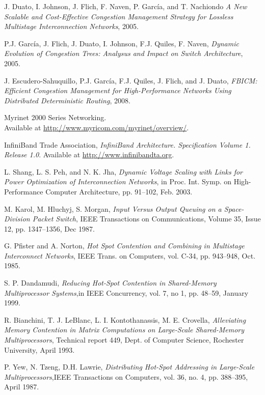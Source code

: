 \documentclass[12pt]{article}
\begin{document}
\begin{thebibliography}{99}

 J. Duato, I. Johnson, J. Flich, F. Naven, P. Garc\'ia, and T. Nachiondo \emph{A New Scalable and Cost-Effective Congestion Management Strategy for Lossless Multistage Interconnection Networks}, 2005.

 P.J. Garc\'ia, J. Flich, J. Duato, I. Johnson, F.J. Quiles, F. Naven, \emph{Dynamic Evolution of Congestion Trees: Analysus and Impact on Switch Architecture}, 2005.

 J. Escudero-Sahuquillo, P.J. Garc\'ia, F.J.  Quiles, J. Flich, and J. Duato, \emph{FBICM: Efficient Congestion Management for High-Performance Networks Using Distributed Deterministic Routing}, 2008.

 Myrinet 2000 Series	 Networking.\\
Available at 
\url{http://www.myricom.com/myrinet/overview/}.

 InfiniBand Trade Association, \emph{InfiniBand Architecture. Specification Volume 1. Release 1.0}. Available at \url{http://www.infinibandta.org}.

 L. Shang, L. S. Peh, and N. K. Jha, \emph{Dynamic Voltage Scaling with Links for Power Optimization of Interconnection Networks}, in Proc. Int. Symp. on High-Performance Computer
Architecture, pp. 91--102, Feb. 2003.

 M. Karol, M. Hluchyj, S. Morgan, \emph{Input Versus Output Queuing on a Space-Division Packet Switch}, IEEE Transactions on Communications, Volume 35, Issue 12, pp. 1347--1356, Dec 1987.

 G. Pfister and A. Norton, \emph{Hot Spot Contention and Combining in Multistage Interconnect Networks}, IEEE Trans. on Computers, vol. C-34, pp. 943--948, Oct. 1985.

 S. P. Dandamudi, \emph{Reducing Hot-Spot Contention in Shared-Memory Multiprocessor Systems},in IEEE Concurrency, vol. 7, no 1, pp. 48--59, January 1999.

 R. Bianchini, T. J. LeBlanc, L. I. Kontothanassis, M. E. Crovella, \emph{Alleviating Memory Contention in Matrix Computations on Large-Scale Shared-Memory Multiprocessors}, Technical report 449, Dept. of Computer Science, Rochester University, April 1993.

 P. Yew, N. Tzeng, D.H. Lawrie, \emph{Distributing Hot-Spot Addressing in Large-Scale Multiprocessors},IEEE Transactions on Computers, vol. 36, no. 4, pp. 388--395, April 1987.


\end{thebibliography}
\end{document}
